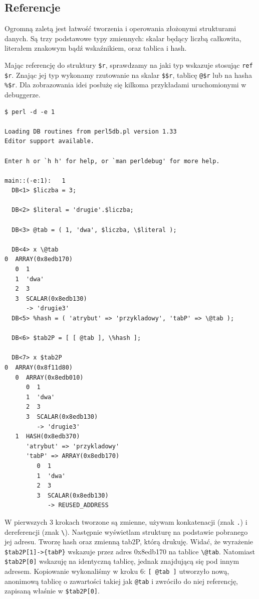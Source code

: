 \documentclass[a4paper,12pt]{article}
\begin{document}

\subsection{Referencje}
Ogromną zaletą jest łatwość tworzenia i operowania złożonymi strukturami danych. Są trzy podstawowe typy zmiennych: skalar będący liczbą całkowita, literałem znakowym bądź wskaźnikiem, oraz tablica i hash.

Mając referencję do struktury \verb|$r|, sprawdzamy na jaki typ wskazuje stosując \verb|ref $r|. Znając jej typ wykonamy rzutowanie na skalar \verb|$$r|, tablicę \verb|@$r| lub na hasha \verb|%$r|. Dla zobrazowania idei posłużę się kilkoma przykładami uruchomionymi w debuggerze.
\begin{verbatim}
$ perl -d -e 1

Loading DB routines from perl5db.pl version 1.33
Editor support available.

Enter h or `h h' for help, or `man perldebug' for more help.

main::(-e:1):	1
  DB<1> $liczba = 3;

  DB<2> $literal = 'drugie'.$liczba;

  DB<3> @tab = ( 1, 'dwa', $liczba, \$literal );

  DB<4> x \@tab
0  ARRAY(0x8edb170)
   0  1
   1  'dwa'
   2  3
   3  SCALAR(0x8edb130)
      -> 'drugie3'
  DB<5> %hash = ( 'atrybut' => 'przykladowy', 'tabP' => \@tab );

  DB<6> $tab2P = [ [ @tab ], \%hash ];

  DB<7> x $tab2P
0  ARRAY(0x8f11d80)
   0  ARRAY(0x8edb010)
      0  1
      1  'dwa'
      2  3
      3  SCALAR(0x8edb130)
         -> 'drugie3'
   1  HASH(0x8edb370)
      'atrybut' => 'przykladowy'
      'tabP' => ARRAY(0x8edb170)
         0  1
         1  'dwa'
         2  3
         3  SCALAR(0x8edb130)
            -> REUSED_ADDRESS

\end{verbatim}
W pierwszych 3 krokach tworzone są zmienne, używam konkatenacji (znak \verb|.|) i dereferencji (znak \verb|\|). Następnie wyświetlam strukturę na podstawie pobranego jej adresu. Tworzę hash oraz zmienną tab2P, którą drukuję. Widać, że wyrażenie \verb|$tab2P[1]->{tabP}| wskazuje przez adres 0x8edb170 na tablice \verb|\@tab|. Natomiast \verb|$tab2P[0]| wskazuję na identyczną tablicę, jednak znajdującą się pod innym adresem. Kopiowanie wykonaliśmy w kroku 6: \verb|[ @tab ]| utworzyło nową, anonimową tablicę o zawartości takiej jak \verb|@tab| i zwróciło do niej referencję, zapisaną właśnie w \verb|$tab2P[0]|.
\end{document}
